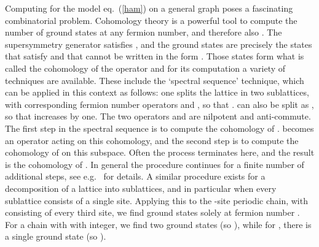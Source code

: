 \documentclass[a4paper,prl,aps,twocolumn]{revtex4}
\begin{document}
Computing \coordHE{} for the model eq.~(\ref{ham}) on a general graph poses a
fascinating combinatorial problem.  Cohomology theory is a powerful
tool to compute the number of ground states at any fermion number, and
therefore also \coordHE{}. The supersymmetry generator \coordHE{} satisfies
\coordHE{}, and the \coordHE{} ground states are precisely the states
\coordHE{} that satisfy \coordHE{} and that cannot be written
in the form \coordHE{}. Those states form what is
called the cohomology of the operator \coordHE{} and for its computation a
variety of techniques are available. These include the `spectral
sequence' technique, which can be applied in this context as follows:
one splits the lattice in two sublattices, with corresponding fermion
number operators \coordHE{} and \coordHE{}, so that \coordHE{}. \coordHE{} can also
be split as \coordHE{}, so that \coordHE{} increases \coordHE{} by
one. The two operators \coordHE{} and \coordHE{} are nilpotent and
anti-commute. The first step in the spectral sequence is to compute
the cohomology of \coordHE{}. \coordHE{} becomes an operator acting on this
cohomology, and the second step is to compute the cohomology of
\coordHE{} on this subspace.  Often the process terminates here, and the
result is the cohomology of \coordHE{}. In general the procedure continues
for a finite number of additional steps, see e.g.~\cite{botttu} for
details.  A similar procedure exists for a decomposition of a lattice
into \coordHE{} sublattices, and in particular when every sublattice consists
of a single site.  Applying this to the \coordHE{}-site periodic chain, with
\coordHE{} consisting of every third site, we find ground states solely at
fermion number \coordHE{}. For a chain with \coordHE{} with
\coordHE{} integer, we find two ground states (so \coordHE{}), while for
\coordHE{}, there is a single ground state (so \coordHE{}).
\end{document}
